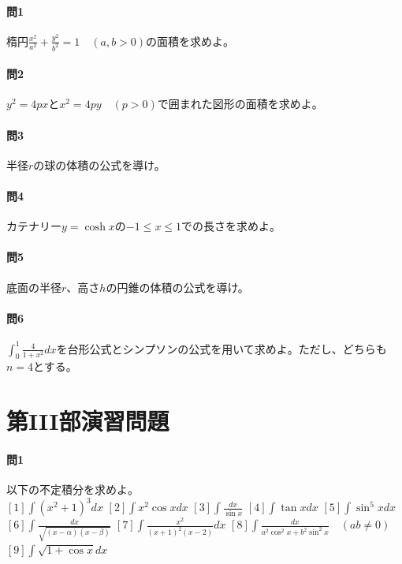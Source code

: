 \documentclass[a4j,dvipdfmx]{jsarticle}
\begin{document}
                \paragraph{問1}楕円$\displaystyle\frac{x^2}{a^2}+\frac{y^2}{b^2}=1\quad (a,b>0)$の面積を求めよ。

                \paragraph{問2}$y^2=4px$と$x^2=4py\quad (p>0)$で囲まれた図形の面積を求めよ。

                \paragraph{問3}半径$r$の球の体積の公式を導け。

                \paragraph{問4}カテナリー$y=\cosh x$の$-1\leq x\leq 1$での長さを求めよ。

                \paragraph{問5}底面の半径$r$、高さ$h$の円錐の体積の公式を導け。

                \paragraph{問6}$\displaystyle \int _0^1 \frac{4}{1+x^2}dx$を台形公式とシンプソンの公式を用いて求めよ。ただし、どちらも$n=4$とする。
            \clearpage
            \section{第III部演習問題}
            \paragraph{問1}以下の不定積分を求めよ。\\
                $\displaystyle [1]\int (x^2+1)^3dx$\hspace{3mm}
                $\displaystyle [2]\int x^2\cos xdx$\hspace{3mm}
                $\displaystyle [3]\int \frac{dx}{\sin x}$\hspace{3mm}
                $\displaystyle [4]\int \tan xdx$\hspace{3mm}
                $\displaystyle [5]\int \sin^5 xdx$
                $\displaystyle [6]\int \frac{dx}{\sqrt{(x-\alpha)(x-\beta)}}$\hspace{3mm}
                $\displaystyle [7]\int \frac{x^2}{(x+1)^2(x-2)}dx$\hspace{3mm}
                $\displaystyle [8]\int\frac{dx}{a^2\cos^2 x+b^2\sin^2 x}\quad(ab\neq 0)$ \hspace{5mm}
                $\displaystyle [9]\int \sqrt{1+\cos x}dx$
            
\end{document}
